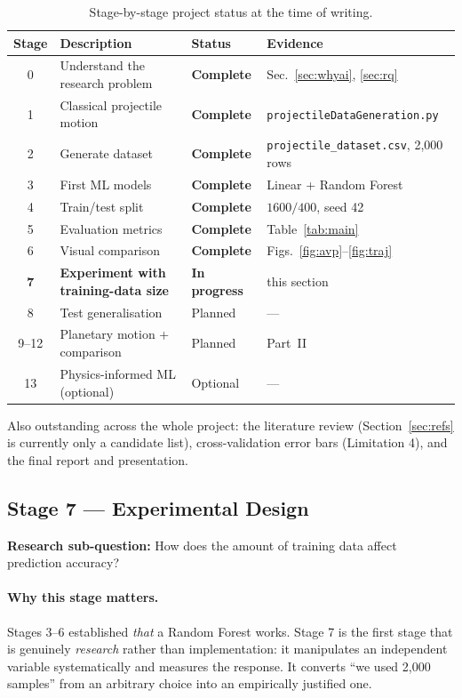 \documentclass[11pt,a4paper]{article}
\newcommand{\stagedone}{\textbf{Complete}}
\newcommand{\stageprog}{\textbf{In progress}}
\newcommand{\stageplan}{Planned}
\begin{document}
\begin{table}[h]
\centering
\small
\caption{Stage-by-stage project status at the time of writing.}
\begin{tabular}{@{}clll@{}}
\toprule
\textbf{Stage} & \textbf{Description} & \textbf{Status} & \textbf{Evidence} \\
\midrule
0     & Understand the research problem      & \stagedone{}  & Sec.~\ref{sec:whyai}, \ref{sec:rq} \\
1     & Classical projectile motion          & \stagedone{}  & \texttt{projectileDataGeneration.py} \\
2     & Generate dataset                     & \stagedone{}  & \texttt{projectile\_dataset.csv}, 2{,}000 rows \\
3     & First ML models                      & \stagedone{}  & Linear + Random Forest \\
4     & Train/test split                     & \stagedone{}  & $1600/400$, seed 42 \\
5     & Evaluation metrics                   & \stagedone{}  & Table~\ref{tab:main} \\
6     & Visual comparison                    & \stagedone{}  & Figs.~\ref{fig:avp}--\ref{fig:traj} \\
\textbf{7} & \textbf{Experiment with training-data size} & \stageprog{} & this section \\
8     & Test generalisation                  & \stageplan{}  & --- \\
9--12 & Planetary motion + comparison        & \stageplan{}  & Part~II \\
13    & Physics-informed ML (optional)       & Optional      & --- \\
\bottomrule
\end{tabular}
\end{table}

Also outstanding across the whole project: the literature review (Section~\ref{sec:refs} is
currently only a candidate list), cross-validation error bars (Limitation 4), and the final report
and presentation.

\subsection{Stage 7 --- Experimental Design}

\textbf{Research sub-question:} How does the amount of training data affect prediction accuracy?

\paragraph{Why this stage matters.}
Stages 3--6 established \emph{that} a Random Forest works. Stage 7 is the first stage that is
genuinely \emph{research} rather than implementation: it manipulates an independent variable
systematically and measures the response. It converts ``we used 2{,}000 samples'' from an arbitrary
choice into an empirically justified one.
\end{document}
